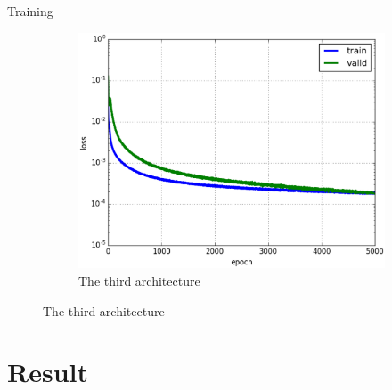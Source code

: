 \documentclass[10pt]{beamer}
\begin{document}
\begin{frame}{Training}{}
\begin{figure}[htbp]
\begin{subfigure}[t]{0.5\textwidth}
        			\includegraphics[scale=.22]{images/loss_model_3}
        			\caption{\scriptsize{The third architecture }}
        			\label{figsub22}
    			\end{subfigure}    		
			\end{figure}
\end{frame}

\section{Result}
\end{document}
